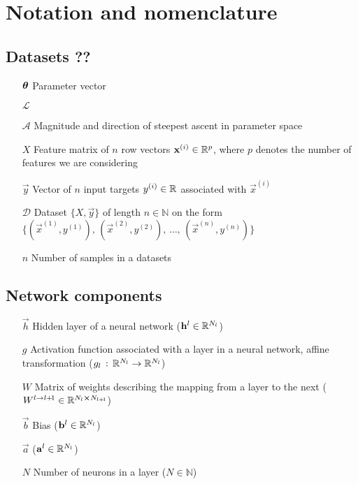 



\section*{Notation and nomenclature}

\noindent\subsection{Datasets ??}
\begin{itemize}
    \item[$\svec{\theta}$] Parameter vector
    \item[$\mathcal{L}$] 
    \item[$\mathcal{A}$] Magnitude and direction of steepest ascent in parameter space
    \item[$X$] Feature matrix of $n$ row vectors $\vec{x}^{(i)} \in \RR[p]$, where $p$ denotes the number of features we are considering
    \item[$\vec{y}$] Vector of $n$ input targets $y^{(i)} \in \RR$ associated with $\vec{x}^{(i)}$
    \item[$\mathcal{D}$] Dataset $\big\{ X, \vec{y} \big\}$ of length $n\in \mathbb{N}$ on the form $\big\{(\vec{x}^{(1)}, y^{(1)}),\,(\vec{x}^{(2)}, y^{(2)}),\,\dots, \, (\vec{x}^{(n)}, y^{(n)}) \big\} $
    \item[$n$] Number of samples in a datasets  
\end{itemize}
\subsection{Network components}
\begin{itemize}
    \item[$\vec{h}$] Hidden layer of a neural network ($\vec{h}^l \in \RR[N_l]$)
    \item[$g$] Activation function associated with a layer in a neural network, affine transformation ($g_l \,:\,\RR[N_l] \to\RR[N_{l}]$)
    \item[$W$] Matrix of weights describing the mapping from a layer to the next ($W^{l\to l+\! 1} \in \RR[N_l \cross N_{l+\! 1}]$)
    \item[$\vec{b}$] Bias ($\vec{b}^l \in \RR[N_l]$) 
    \item[$\vec{a}$]  ($\vec{a}^l \in \RR[N_l]$)
    \item[$N$] Number of neurons in a layer ($N \in \mathbb{N}$)
\end{itemize}


